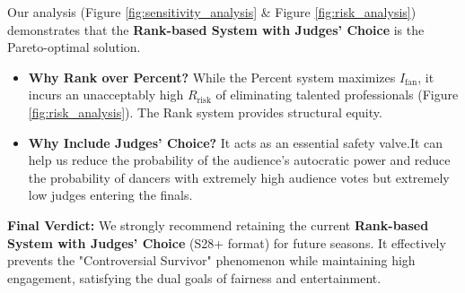 Our analysis (Figure \ref{fig:sensitivity_analysis} \& Figure \ref{fig:risk_analysis}) demonstrates that the \textbf{Rank-based System with Judges' Choice} is the Pareto-optimal solution.
\begin{itemize}
    \item \textbf{Why Rank over Percent?} While the Percent system maximizes $I_{\text{fan}}$, it incurs an unacceptably high $R_{\text{risk}}$ of eliminating talented professionals (Figure \ref{fig:risk_analysis}). The Rank system provides structural equity.
    \item \textbf{Why Include Judges' Choice?} It acts as an essential safety valve.It can help us reduce the probability of the audience's autocratic power and reduce the probability of dancers with extremely high audience votes but extremely low judges entering the finals.
\end{itemize}

\textbf{Final Verdict:} We strongly recommend retaining the current \textbf{Rank-based System with Judges' Choice} (S28+ format) for future seasons. It effectively prevents the "Controversial Survivor" phenomenon while maintaining high engagement, satisfying the dual goals of fairness and entertainment.
